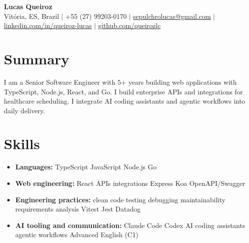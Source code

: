 \documentclass[letterpaper,10pt]{article}
\newcommand{\resumeItem}[1]{\item\small{#1}}
\newcommand{\resumeSubHeadingList}{\begin{itemize}[leftmargin=0.15in, label={}, nosep]}
\newcommand{\resumeSubHeadingListEnd}{\end{itemize}}
\begin{document}
\begin{center}
  \textbf{\Huge Lucas Queiroz} \\[3pt]
  \small Vit\'oria, ES, Brazil $|$ +55 (27) 99203-0170 $|$ \href{mailto:sepulchrolucas@gmail.com}{sepulchrolucas@gmail.com} $|$
  \href{https://linkedin.com/in/queiroz-lucas}{linkedin.com/in/queiroz-lucas} $|$
  \href{https://github.com/queirozlc}{github.com/queirozlc}
\end{center}
\vspace{2pt}

\section{Summary}
I am a Senior Software Engineer with 5+ years building web applications with TypeScript, Node.js, React, and Go. I build enterprise APIs and integrations for healthcare scheduling. I integrate AI coding assistants and agentic workflows into daily delivery.

\section{Skills}
\resumeSubHeadingList
\resumeItem{\textbf{Languages:} TypeScript \textbar{} JavaScript \textbar{} Node.js \textbar{} Go}
\resumeItem{\textbf{Web engineering:} React \textbar{} APIs \textbar{} integrations \textbar{} Express \textbar{} Koa \textbar{} OpenAPI/Swagger}
\resumeItem{\textbf{Engineering practices:} clean code \textbar{} testing \textbar{} debugging \textbar{} maintainability \textbar{} requirements analysis \textbar{} Vitest \textbar{} Jest \textbar{} Datadog}
\resumeItem{\textbf{AI tooling and communication:} Claude Code \textbar{} Codex \textbar{} AI coding assistants \textbar{} agentic workflows \textbar{} Advanced English (C1)}
\resumeSubHeadingListEnd
\end{document}

